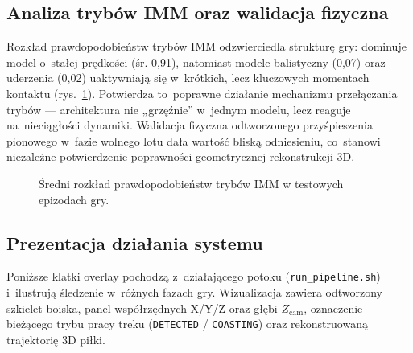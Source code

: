 \documentclass[14pt,a4paper]{extarticle}
\begin{document}
\subsection{Analiza trybów IMM oraz walidacja fizyczna}
Rozkład prawdopodobieństw trybów IMM odzwierciedla strukturę gry: dominuje model
o~stałej prędkości (śr. 0,91), natomiast modele balistyczny (0,07) oraz uderzenia (0,02)
uaktywniają się w~krótkich, lecz kluczowych momentach kontaktu (rys.~\ref{fig:immbar}).
Potwierdza to~poprawne działanie mechanizmu przełączania trybów — architektura nie „grzęźnie”
w~jednym modelu, lecz reaguje na~nieciągłości dynamiki. Walidacja fizyczna odtworzonego
przyśpieszenia pionowego w~fazie wolnego lotu dała wartość bliską odniesieniu, co~stanowi
niezależne potwierdzenie poprawności geometrycznej rekonstrukcji 3D.

\begin{figure}[H]
\centering
{}
\caption{Średni rozkład prawdopodobieństw trybów IMM w testowych epizodach gry.}
\label{fig:immbar}
\end{figure}

\subsection{Prezentacja działania systemu}
\begin{sloppypar}
Poniższe klatki overlay pochodzą z~działającego potoku (\texttt{run\_pipeline.sh}) i~ilustrują
śledzenie w~różnych fazach gry. Wizualizacja zawiera odtworzony szkielet boiska, panel
współrzędnych X/Y/Z oraz głębi $Z_{\text{cam}}$, oznaczenie bieżącego trybu pracy treku
(\texttt{DETECTED} / \texttt{COASTING}) oraz rekonstruowaną trajektorię 3D piłki.
\end{sloppypar}
\end{document}
